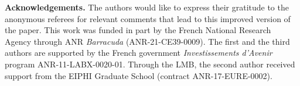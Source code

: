 \documentclass[a4paper]{amsart}
\theoremstyle{definition}
\theoremstyle{remark}
\begin{document}
\bigskip

\noindent
\textbf{Acknowledgements.} The authors would like to express their gratitude to the anonymous referees for relevant comments that lead to this improved version of the paper.
This work was funded in part by the French National Research Agency through ANR \textit{Barracuda} (ANR-21-CE39-0009). The first and the third authors are supported by the French government \textit{Investissements d’Avenir} program ANR-11-LABX-0020-01. Through the LMB, the second author received support from the  EIPHI Graduate School (contract ANR-17-EURE-0002).




\end{document}
